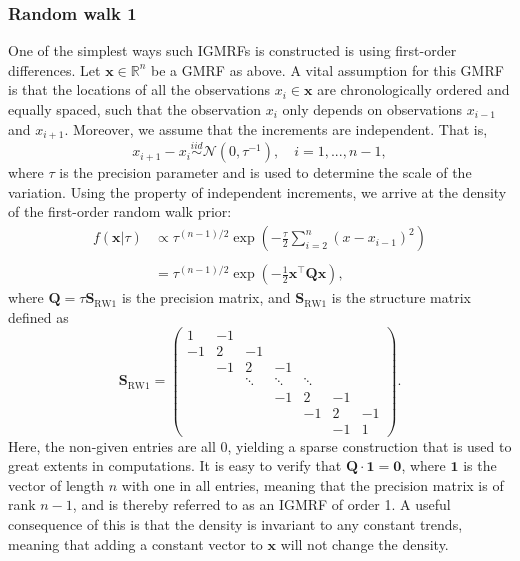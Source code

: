 \subsubsection{Random walk 1}
One of the simplest ways such IGMRFs is constructed is using first-order differences. Let $\pmb x\in\mathbb{R}^n$ be a GMRF as above. A vital assumption for this GMRF is that the locations of all the observations $x_i\in\pmb x$ are chronologically ordered and equally spaced, such that the observation $x_i$ only depends on observations $x_{i-1}$ and $x_{i+1}$. Moreover, we assume that the increments are independent. That is,
\begin{equation*}
    x_{i+1} - x_i \overset{iid}{\sim} \mathcal{N}(0, \tau^{-1}), \quad i = 1,...,n-1,
\end{equation*}
where $\tau$ is the precision parameter and is used to determine the scale of the variation. Using the property of independent increments, we arrive at the density of the first-order random walk prior: 
\begin{align*}
    f(\pmb x|\tau) & \propto \tau^{(n-1)/2}\exp\left( -\frac{\tau}{2}\sum_{i=2}^n(x - x_{i-1})^2 \right)\\\\
    & = \tau^{(n-1)/2}\exp\left( -\frac{1}{2}\pmb x^\top \pmb Q \pmb x \right),
\end{align*}
where $\pmb Q = \tau \pmb S_{\text{RW1}}$ is the precision matrix, and $\pmb S_{\text{RW1}}$ is the structure matrix defined as
\begin{equation}
    \pmb S_{\text{RW1}} = \begin{pmatrix}
        1 & -1 &  &  &  &&\\
        -1 & 2 & -1 &  &  &&\\
        & -1&  2& -1& \\
         & & \ddots& \ddots &\ddots & &  \\
         &&&-1&2&-1&\\
         & && & -1 & 2 & -1 \\
         & && &  & -1 & 1 
        \end{pmatrix}.
        \label{eqn:rw1-structure-matrix}
\end{equation}
Here, the non-given entries are all 0, yielding a sparse construction that is used to great extents in computations. It is easy to verify that $\pmb Q\cdot \pmb 1 = \pmb 0$, where $\pmb 1$ is the vector of length $n$ with one in all entries, meaning that the precision matrix is of rank $n-1$, and is thereby referred to as an IGMRF of order 1. A useful consequence of this is that the density is invariant to any constant trends, meaning that adding a constant vector to $\pmb x$ will not change the density.

